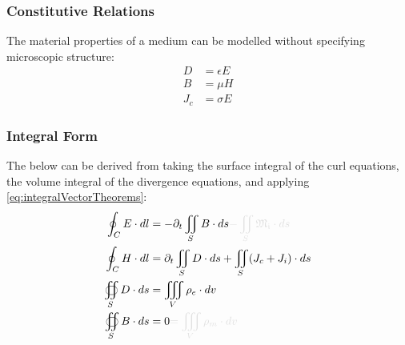 \documentclass{article}
\numberwithin{equation}{section}
\begin{document}
        \subsubsection{Constitutive Relations} 
            The material properties of a medium can be modelled without specifying 
            microscopic structure:
            \begin{subequations}\label{eq:Constitutive}
                \begin{align}
                    D &= \epsilon E \label{eq:ConstitutiveElectric} \\ 
                    B &= \mu H \label{eq:ConstitutiveMagnetic} \\
                    J_c &= \sigma E \label{eq:ConstitutiveCurrentDensity}
                \end{align}
            \end{subequations}
        \subsubsection{Integral Form}
            The below can be derived from taking the surface integral of the curl
            equations, the volume integral of the divergence equations, and applying 
            \eqref{eq:integralVectorTheorems}:
            \begin{subequations}\label{eq:MaxwellIntegral}
                \begin{align}
                    \oint_C E \cdot dl &=  - \partial_t \iint_S B \cdot ds \begingroup 
                        \textcolor{vanish}{- \iint_S \mathfrak{M_i} \cdot ds} \endgroup 
                        \label{eq:MaxwellFaradayIntegral} \\
                    \oint_C H \cdot dl &= \partial_t \iint_S D \cdot ds + \iint_S 
                        ( J_c + J_i ) \cdot ds \label{eq:AmpereMaxwellIntegral} \\
                    \oiint_S D \cdot ds &= \iiint_V \rho_e \cdot dv 
                        \label{eq:GaussElectricIntegral} \\
                    \oiint_S B \cdot ds &= 0 \begingroup \textcolor{vanish}{= \iiint_V 
                        \rho_m \cdot dv} \endgroup \label{eq:GaussMagneticIntegral}
                \end{align}
            \end{subequations}
\end{document}
